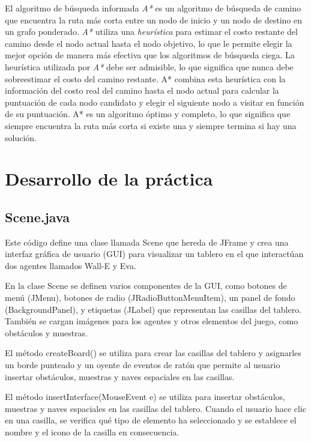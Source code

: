 \documentclass{article}
\begin{document}
El algoritmo de búsqueda informada \emph{A*} es un algoritmo de búsqueda de camino que encuentra la ruta más corta entre un nodo de inicio y un nodo de destino en un grafo ponderado. \emph{A*} utiliza una \emph{heurística} para estimar el costo restante del camino desde el nodo actual hasta el nodo objetivo, lo que le permite elegir la mejor opción de manera más efectiva que los algoritmos de búsqueda ciega. La heurística utilizada por \emph{A*} debe ser admisible, lo que significa que nunca debe sobreestimar el costo del camino restante. A* combina esta heurística con la información del costo real del camino hasta el nodo actual para calcular la puntuación de cada nodo candidato y elegir el siguiente nodo a visitar en función de su puntuación. A* es un algoritmo óptimo y completo, lo que significa que siempre encuentra la ruta más corta si existe una y siempre termina si hay una solución.

\section{Desarrollo de la práctica}

\subsection{Scene.java}

Este código define una clase llamada Scene que hereda de JFrame y crea una interfaz gráfica de usuario (GUI) para visualizar un tablero en el que interactúan dos agentes llamados Wall-E y Eva.

En la clase Scene se definen varios componentes de la GUI, como botones de menú (JMenu), botones de radio (JRadioButtonMenuItem), un panel de fondo (BackgroundPanel), y etiquetas (JLabel) que representan las casillas del tablero. También se cargan imágenes para los agentes y otros elementos del juego, como obstáculos y muestras.

El método createBoard() se utiliza para crear las casillas del tablero y asignarles un borde punteado y un oyente de eventos de ratón que permite al usuario insertar obstáculos, muestras y naves espaciales en las casillas.

El método insertInterface(MouseEvent e) se utiliza para insertar obstáculos, muestras y naves espaciales en las casillas del tablero. Cuando el usuario hace clic en una casilla, se verifica qué tipo de elemento ha seleccionado y se establece el nombre y el icono de la casilla en consecuencia.
\end{document}
